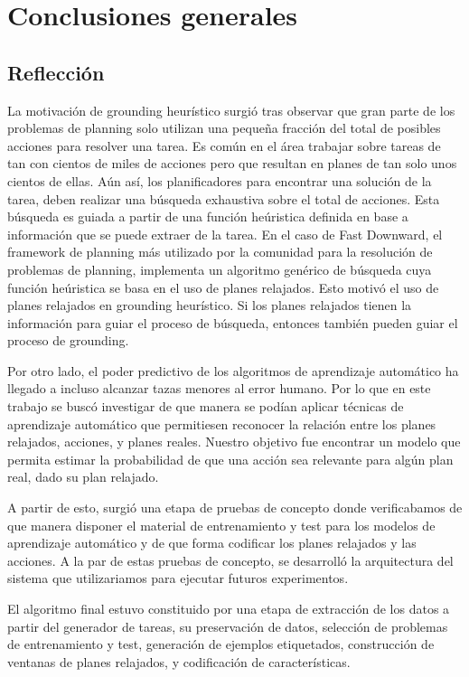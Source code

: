 \chapter{Conclusiones generales}
\label{ch:con}

\section{Reflección}

La motivación de grounding heurístico surgió tras observar que gran parte de los
problemas de planning solo utilizan una pequeña fracción del total de posibles
acciones para resolver una tarea. Es común en el área trabajar sobre tareas de
tan con cientos de miles de acciones pero que resultan en planes de tan solo
unos cientos de ellas. Aún así, los planificadores para encontrar una solución
de la tarea, deben realizar una búsqueda exhaustiva sobre el total de acciones.
Esta búsqueda es guiada a partir de una función heúristica definida en base a
información que se puede extraer de la tarea. En el caso de Fast Downward, el
framework de planning más utilizado por la comunidad para la resolución de
problemas de planning, implementa un algoritmo genérico de búsqueda cuya función
heúristica se basa en el uso de planes relajados. Esto motivó el uso de planes
relajados en grounding heurístico. Si los planes relajados tienen la información
para guiar el proceso de búsqueda, entonces también pueden guiar el proceso de
grounding.

Por otro lado, el poder predictivo de los algoritmos de aprendizaje automático
ha llegado a incluso alcanzar tazas menores al error humano. Por lo que en este
trabajo se buscó investigar de que manera se podían aplicar técnicas de
aprendizaje automático que permitiesen reconocer la relación entre los planes
relajados, acciones, y planes reales. Nuestro objetivo fue encontrar un modelo
que permita estimar la probabilidad de que una acción sea relevante para algún
plan real, dado su plan relajado.

A partir de esto, surgió una etapa de pruebas de concepto donde verificabamos de
que manera disponer el material de entrenamiento y test para los modelos de
aprendizaje automático y de que forma codificar los planes relajados y las
acciones. A la par de estas pruebas de concepto, se desarrolló la arquitectura
del sistema que utilizariamos para ejecutar futuros experimentos.

El algoritmo final estuvo constituido por una etapa de extracción de los datos a
partir del generador de tareas, su preservación de datos, selección de problemas
de entrenamiento y test, generación de ejemplos etiquetados, construcción de
ventanas de planes relajados, y codificación de características.

